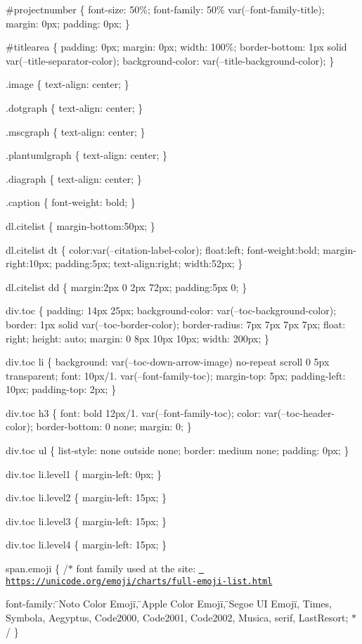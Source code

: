 \#projectnumber \{ font-\/size\+: 50\%; font-\/family\+: 50\% var(--font-\/family-\/title); margin\+: 0px; padding\+: 0px; \}

\#titlearea \{ padding\+: 0px; margin\+: 0px; width\+: 100\%; border-\/bottom\+: 1px solid var(--title-\/separator-\/color); background-\/color\+: var(--title-\/background-\/color); \}

.image \{ text-\/align\+: center; \}

.dotgraph \{ text-\/align\+: center; \}

.mscgraph \{ text-\/align\+: center; \}

.plantumlgraph \{ text-\/align\+: center; \}

.diagraph \{ text-\/align\+: center; \}

.caption \{ font-\/weight\+: bold; \}

dl.\+citelist \{ margin-\/bottom\+:50px; \}

dl.\+citelist dt \{ color\+:var(--citation-\/label-\/color); float\+:left; font-\/weight\+:bold; margin-\/right\+:10px; padding\+:5px; text-\/align\+:right; width\+:52px; \}

dl.\+citelist dd \{ margin\+:2px 0 2px 72px; padding\+:5px 0; \}

div.\+toc \{ padding\+: 14px 25px; background-\/color\+: var(--toc-\/background-\/color); border\+: 1px solid var(--toc-\/border-\/color); border-\/radius\+: 7px 7px 7px 7px; float\+: right; height\+: auto; margin\+: 0 8px 10px 10px; width\+: 200px; \}

div.\+toc li \{ background\+: var(--toc-\/down-\/arrow-\/image) no-\/repeat scroll 0 5px transparent; font\+: 10px/1. var(--font-\/family-\/toc); margin-\/top\+: 5px; padding-\/left\+: 10px; padding-\/top\+: 2px; \}

div.\+toc h3 \{ font\+: bold 12px/1. var(--font-\/family-\/toc); color\+: var(--toc-\/header-\/color); border-\/bottom\+: 0 none; margin\+: 0; \}

div.\+toc ul \{ list-\/style\+: none outside none; border\+: medium none; padding\+: 0px; \}

div.\+toc li.\+level1 \{ margin-\/left\+: 0px; \}

div.\+toc li.\+level2 \{ margin-\/left\+: 15px; \}

div.\+toc li.\+level3 \{ margin-\/left\+: 15px; \}

div.\+toc li.\+level4 \{ margin-\/left\+: 15px; \}

span.\+emoji \{ /\texorpdfstring{$\ast$}{*} font family used at the site\+: \href{https://unicode.org/emoji/charts/full-emoji-list.html}{\texttt{ https\+://unicode.\+org/emoji/charts/full-\/emoji-\/list.\+html}}
\begin{DoxyItemize}
\item font-\/family\+: \"{}\+Noto Color Emoji\"{}, \"{}\+Apple Color Emoji\"{}, \"{}\+Segoe UI Emoji\"{}, Times, Symbola, Aegyptus, Code2000, Code2001, Code2002, Musica, serif, Last\+Resort; \texorpdfstring{$\ast$}{*}/ \}
\end{DoxyItemize}


